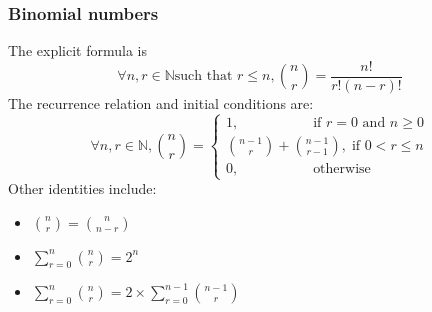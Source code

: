 \documentclass[12pt]{article}
\begin{document}
\subsubsection{Binomial numbers}
The explicit formula is 
\[
\forall n,r\in\mathbb{N} \text{such that }r\leq n, \binom{n}{r}=\frac{n!}{r!(n-r)!}
\]
The recurrence relation and initial conditions are:
\[
\forall n,r\in\mathbb{N}, \binom{n}{r}=\begin{cases}
          1,\;\;\;\;\;\;\;\;\;\;\;\;\;\;\;\;\;\;\;\text{if }r=0\text{ and }n\geq 0\\
          \binom{n-1}{r}+\binom{n-1}{r-1}, \;\text{if }0<r\leq n\\
          0,\;\;\;\;\;\;\;\;\;\;\;\;\;\;\;\;\;\;\;\text{otherwise}
          \end{cases}
\]
Other identities include:
\begin{itemize}
\item $\binom{n}{r}=\binom{n}{n-r}$
\item $\sum^n_{r=0}\binom{n}{r}=2^n$
\item $\sum^n_{r=0}\binom{n}{r}=2\times \sum^{n-1}_{r=0}\binom{n-1}{r}$
\end{itemize}
\end{document}
